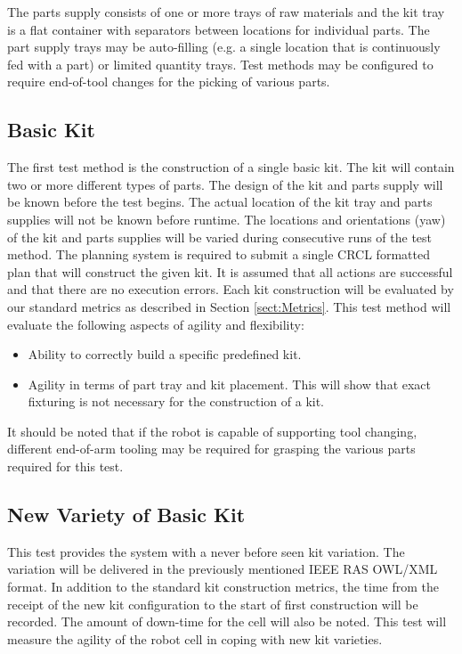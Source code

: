 The parts supply consists of one or more trays of raw materials and
the kit tray is a flat container with separators between locations for individual parts. The part supply trays may be auto-filling (e.g.
a single location that is continuously fed with a part) or limited quantity trays. Test methods may be configured to require end-of-tool
changes for the picking of various parts.

\subsection{Basic Kit}
The first test method is the construction of a single basic kit. The kit will contain two or more different types of parts. The design of the
kit and parts supply will be known before the test begins. The actual location of the kit tray and parts supplies will not be known before
runtime. The locations and orientations (yaw) of the kit and parts supplies will be varied during consecutive runs of the test method.
The planning system is required to submit a single CRCL formatted plan that will construct the given kit. It is assumed that all
actions are successful and that there are no execution errors.
Each kit construction will be evaluated by our standard metrics as described in Section \ref{sect:Metrics}.
This test method will evaluate the following aspects of agility and flexibility:
\begin{itemize}
	\item Ability to correctly build a specific predefined kit.
	\item Agility in terms of part tray and kit placement. This will show that exact fixturing is not necessary for the construction
	of a kit.
\end{itemize}

It should be noted that if the robot is capable of supporting tool changing, different end-of-arm tooling may be required for grasping
the various parts required for this test.


\subsection{New Variety of Basic Kit}
This test provides the system with a never before seen kit variation. The variation will be delivered in the previously
mentioned IEEE RAS OWL/XML format. In addition to the standard kit construction metrics, the time from the receipt
of the new kit configuration to the start of first construction will be recorded. The amount of down-time for the
cell will also be noted. This test will measure the agility of the robot cell in coping with new kit varieties.

